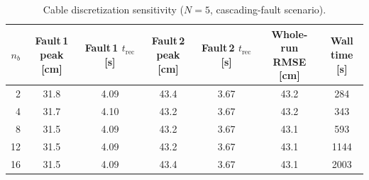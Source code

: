 \begin{table}[t]
  \centering
  \caption{Cable discretization sensitivity ($N{=}5$, cascading-fault scenario).}
  \label{tab:bead_discretization}
  \setlength{\tabcolsep}{4pt}
  \begin{tabular}{r c c c c c c}
    \toprule
    $n_b$ & \makecell{Fault\,1\\peak [cm]} & \makecell{Fault\,1\\$t_{\mathrm{rec}}$ [s]} & \makecell{Fault\,2\\peak [cm]} & \makecell{Fault\,2\\$t_{\mathrm{rec}}$ [s]} & \makecell{Whole-run\\RMSE [cm]} & \makecell{Wall\\time [s]} \\
    \midrule
    2 & 31.8 & 4.09 & 43.4 & 3.67 & 43.2 & 284 \\
    4 & 31.7 & 4.10 & 43.2 & 3.67 & 43.2 & 343 \\
    8 & 31.5 & 4.09 & 43.2 & 3.67 & 43.1 & 593 \\
    12 & 31.5 & 4.09 & 43.2 & 3.67 & 43.1 & 1144 \\
    16 & 31.5 & 4.09 & 43.4 & 3.67 & 43.1 & 2003 \\
    \bottomrule
  \end{tabular}
\end{table}
